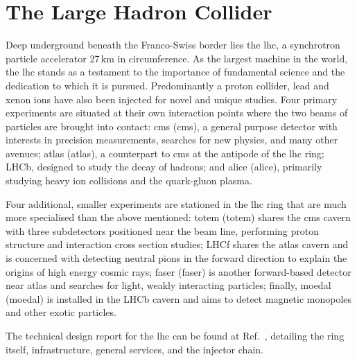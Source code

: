

\section{The Large Hadron Collider}
\label{sec:detector_lhc}

Deep underground beneath the Franco-Swiss border lies the \acrfull{lhc}, a synchrotron particle accelerator 27\,km in circumference. As the largest machine in the world, the \acrshort{lhc} stands as a testament to the importance of fundamental science and the dedication to which it is pursued. Predominantly a proton collider, lead and xenon ions have also been injected for novel and unique studies. Four primary experiments are situated at their own interaction points where the two beams of particles are brought into contact: \acrshort{cms} (\acrlong{cms}), a general purpose detector with interests in precision measurements, searches for new physics, and many other avenues; \acrshort{atlas} (\acrlong{atlas}), a counterpart to \acrshort{cms} at the antipode of the \acrshort{lhc} ring; LHCb, designed to study the decay of \PB hadrons; and \acrshort{alice} (\acrlong{alice}), primarily studying heavy ion collisions and the quark-gluon plasma.

Four additional, smaller experiments are stationed in the \acrshort{lhc} ring that are much more specialised than the above mentioned: \acrshort{totem} (\acrlong{totem}) shares the \acrshort{cms} cavern with three subdetectors positioned near the beam line, performing proton structure and interaction cross section studies; LHCf shares the \acrshort{atlas} cavern and is concerned with detecting neutral pions in the forward direction to explain the origins of high energy cosmic rays; \acrshort{faser} (\acrlong{faser}) is another forward-based detector near \acrshort{atlas} and searches for light, weakly interacting particles; finally, \acrshort{moedal} (\acrlong{moedal}) is installed in the LHCb cavern and aims to detect magnetic monopoles and other exotic particles.

The technical design report for the \acrshort{lhc} can be found at Ref.~\cite{lhc_design_report}, detailing the ring itself, infrastructure, general services, and the injector chain.




